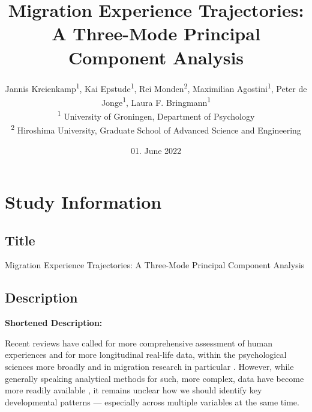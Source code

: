 \documentclass[]{article}
\title{Migration Experience Trajectories: A Three-Mode Principal
Component Analysis}
\author{
          Jannis Kreienkamp\textsuperscript{1},
          Kai Epstude\textsuperscript{1},
          Rei Monden\textsuperscript{2},
          Maximilian Agostini\textsuperscript{1},
          Peter de Jonge\textsuperscript{1},
          Laura F.
Bringmann\textsuperscript{1}          \\ \vspace{0.5cm}
              \textsuperscript{1} University of Groningen, Department of
Psychology\\
              \textsuperscript{2} Hiroshima University, Graduate School
of Advanced Science and Engineering      }
\date{01. June 2022}
\newcounter{question}
\begin{document}
\maketitle
\vspace{2pc}


\newcommand\Question[2]{%
   \leavevmode\par
   \stepcounter{question}
   \noindent
   \textbf{\thequestion. #1}. #2\par}

\newcommand\Answer[1]{%
    \noindent
    \textit{Registered response}: #1\par}

\newlength{\mylength}
\setlength{\fboxsep}{15pt}
\setlength{\mylength}{\linewidth}
\addtolength{\mylength}{-2\fboxsep}
\addtolength{\mylength}{-2\fboxrule}

\hypertarget{study-information}{%
\section{Study Information}\label{study-information}}

\hypertarget{title}{%
\subsection{Title}\label{title}}

Migration Experience Trajectories: A Three-Mode Principal Component
Analysis

\hypertarget{description}{%
\subsection{Description}\label{description}}

\textbf{Shortened Description:}

Recent reviews have called for more comprehensive assessment of human
experiences and for more longitudinal real-life data, within the
psychological sciences more broadly and in migration research in
particular
\citep[e.g.,][]{Kreienkamp2022d, MacInnis2015, McKeown2017, Pettigrew2011, Ward2019}.
However, while generally speaking analytical methods for such, more
complex, data have become more readily available
\citep[e.g.,][]{ODonnell2021}, it remains unclear how we should identify
key developmental patterns --- especially across multiple variables at
the same time.
\end{document}

